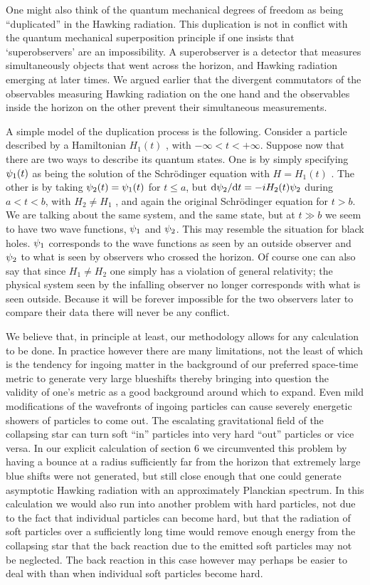 One might also think of the
quantum mechanical degrees of freedom as
being ``duplicated'' in the Hawking radiation. This duplication is not
in conflict with the quantum mechanical superposition principle if one
insists that `superobservers' are an impossibility. A superobserver is
a detector that measures simultaneously objects that went across the
horizon, and Hawking radiation emerging at later times. We argued
earlier that the divergent commutators of the observables measuring
Hawking radiation on the one hand and the observables inside the
horizon on the other prevent their simultaneous measurements.

A simple model of the duplication process is the following. Consider a
particle described by a Hamiltonian $H_1(t)$ , with
$-\infty<t<+\infty$.  Suppose now that there are two ways to describe
its quantum states. One is by simply specifying $\psi_1(t)$ as being the
solution of the Schr\"odinger equation with $H=H_1(t)$ . The other is
by taking $\psi_2(t) =\psi_1(t)$ for $t\leq a$, but ${\rm
d\psi_2/d}t=-iH_2(t)\psi_2$ during $a<t<b$, with $H_2 \ne H_1$ , and again
the original Schr\"odinger equation for $t>b$.  We are talking about
the same system, and the same state, but at $t\gg b$ we seem to have
two wave functions, $\psi_1$ and $\psi_2$. This may resemble the situation
for black holes.  $\psi_1$ corresponds to the wave functions as seen by
an outside observer and $\psi_2$ to what is seen by observers who crossed
the horizon. Of course one can also say that since $H_1\ne H_2$ one
simply has a violation of general relativity; the physical system seen
by the infalling observer no longer corresponds with what is seen
outside. Because it will be forever impossible for the two observers
later to compare their data there will never be any conflict.

We believe that, in principle at least, our methodology allows for any
calculation to be done. In practice however there are many limitations,
not the least of which is the tendency for ingoing matter in the
background of our preferred space-time metric to generate very large
blueshifts thereby bringing into question the validity of one's metric
as a good background around which to expand. Even mild modifications of
the wavefronts of ingoing particles can cause severely energetic
showers of particles to come out. The escalating gravitational field of
the collapsing star can turn soft ``in'' particles into very hard
``out'' particles or vice versa. In our explicit calculation of section
6 we circumvented this problem by having a bounce at a radius
sufficiently far from the horizon that extremely large blue shifts were
not generated, but still close enough that one could generate
asymptotic Hawking radiation with an approximately Planckian spectrum.
In this calculation we would also run into another problem with hard
particles, not due to the fact that individual particles can become
hard, but that the radiation of soft particles over a sufficiently long
time would remove enough energy from the collapsing star that the back
reaction due to the emitted soft particles may not be neglected. The
back reaction in this case however may perhaps be easier to deal with
than when individual soft particles become hard.

